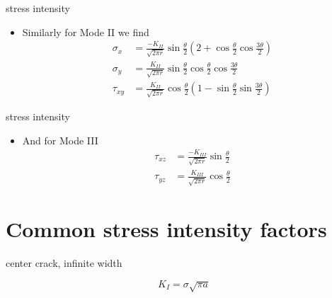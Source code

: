 \documentclass[10pt]{beamer}
\begin{document}
\begin{frame}{stress intensity}
	\begin{itemize}
		\item Similarly for Mode II we find
		\begin{align*}
		\sigma_x &= \frac{-K_{II}}{\sqrt{2\pi r}} \sin \frac{\theta}{2} \left(2+\cos \frac{\theta}{2}\cos \frac{3\theta}{2}\right)\\
		\sigma_y &= \frac{K_{II}}{\sqrt{2\pi r}} \sin \frac{\theta}{2} \cos \frac{\theta}{2}\cos \frac{3\theta}{2}\\
		\tau_{xy} &= \frac{K_{II}}{\sqrt{2\pi r}} \cos \frac{\theta}{2} \left(1-\sin \frac{\theta}{2}\sin \frac{3\theta}{2}\right)
		\end{align*}
	\end{itemize}
\end{frame}

\begin{frame}{stress intensity}
	\begin{itemize}
		\item And for Mode III
		\begin{align*}
		\tau_{xz} &= \frac{-K_{III}}{\sqrt{2\pi r}} \sin \frac{\theta}{2} \\
		\tau_{yz} &= \frac{K_{III}}{\sqrt{2\pi r}} \cos \frac{\theta}{2} 
		\end{align*}
	\end{itemize}
\end{frame}

\section{Common stress intensity factors}

\begin{frame}{center crack, infinite width}
	\begin{figure}[H]
		\begin{equation}
		K_I = \sigma \sqrt{\pi a}
		\end{equation}
		\centering
	\end{figure}
\end{frame}
\end{document}
